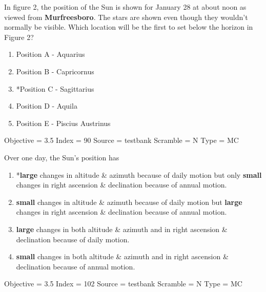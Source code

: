 \documentclass[11pt]{article}
\begin{document}
\begin{enumerate}
\begin{minipage}{\textwidth}
\begin{minipage}{\textwidth}
\item In figure 2, the position of the Sun is shown for January 28 at about noon as viewed from {\bf Murfreesboro}.  The stars are shown even though they wouldn't normally be visible.  Which location will be the first to set below the horizon in Figure 2?
\begin{multicols}{2}
\begin{enumerate} 
\setlength{\itemsep}{1pt} 
\setlength{\parskip}{0pt} 
\setlength{\parsep}{0pt}
\setlength{\multicolsep}{1pt} 
\item Position A - Aquarius
\item Position B - Capricornus
\item *Position C - Sagittarius
\item Position D - Aquila
\item Position E - Piscius Austrinus
\end{enumerate} 
\vfill 
\end{multicols}

Objective = 3.5
Index = 90
Source = testbank
Scramble = N
Type = MC
\end{minipage}
\end{minipage}
\vskip 0.20in

\begin{minipage}{\textwidth}
\begin{minipage}{\textwidth}
\item Over one day, the Sun's position has
\begin{enumerate} 
\setlength{\itemsep}{1pt} 
\setlength{\parskip}{0pt} 
\setlength{\parsep}{0pt}
\setlength{\multicolsep}{1pt} 
\item *{\bf large} changes in altitude \& azimuth because of daily motion but only {\bf small} changes in right ascension \& declination because of annual motion.
\item {\bf small} changes in  altitude \& azimuth because of daily motion  but {\bf large} changes in  right ascension \& declination because of annual motion.
\item {\bf large} changes in both  altitude \& azimuth and in right ascension \& declination because of daily motion.
\item {\bf small} changes in both  altitude \& azimuth and in right ascension \& declination because of annual motion.
\end{enumerate} 
Objective = 3.5
Index = 102
Source = testbank
Scramble = N
Type = MC
\end{minipage}
\end{minipage}
\vskip 0.20in


\end{enumerate}
\end{document}
